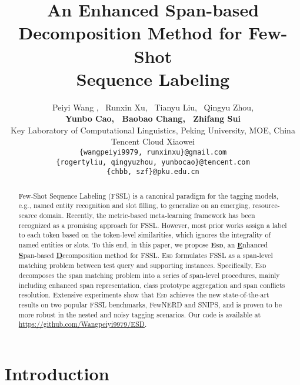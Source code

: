 \documentclass[11pt]{article}
\title{An Enhanced Span-based Decomposition Method for Few-Shot \\ Sequence Labeling}
\author{
Peiyi Wang , \ Runxin Xu, \  Tianyu Liu, \  Qingyu Zhou, \\
\textbf{Yunbo Cao, \  Baobao Chang, \  Zhifang Sui}
\\ 
 Key Laboratory of Computational Linguistics, Peking University, MOE, China \\
 Tencent Cloud Xiaowei \\
 \texttt{\{wangpeiyi9979, runxinxu\}@gmail.com} \\
 \texttt{\{rogertyliu, qingyuzhou, yunbocao\}@tencent.com} \\
 \texttt{\{chbb, szf\}@pku.edu.cn}
}
\newcommand{\modelname}{\textsc{Esd}\xspace}
\begin{document}
\maketitle
\renewcommand{\thefootnote}{\fnsymbol{footnote}}
\begin{abstract}
Few-Shot Sequence Labeling (FSSL) is a canonical paradigm for the tagging models, e.g., named entity recognition and slot filling, to generalize on an emerging, resource-scarce domain.
Recently, the metric-based meta-learning framework has been recognized as a promising approach for FSSL.
However, most prior works assign a label to each token based on the token-level similarities, which ignores the integrality of named entities or slots.
To this end, in this paper, we propose \textbf{\modelname}, an \underline{\textbf{E}}nhanced \underline{\textbf{S}}pan-based \underline{\textbf{D}}ecomposition method for FSSL.
\modelname formulates FSSL as a span-level matching problem between test query and supporting instances.
Specifically, \modelname decomposes the span matching problem into a series of span-level procedures, mainly including enhanced span representation, class prototype aggregation and span conflicts resolution.
Extensive experiments show that \modelname achieves the new state-of-the-art results on two popular FSSL benchmarks, FewNERD and SNIPS, and is proven to be more robust in the nested and noisy tagging scenarios. 
Our code is available at \url{https://github.com/Wangpeiyi9979/ESD}.

 \end{abstract}

\renewcommand{\thefootnote}{\arabic{footnote}}

\section{Introduction}
\end{document}
